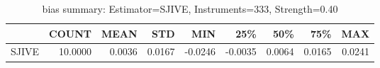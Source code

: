\begin{table}[ht]
\centering
\caption{bias summary: Estimator=SJIVE, Instruments=333, Strength=0.40}
\begin{tabular}{lrrrrrrrr}
\toprule
 & COUNT & MEAN & STD & MIN & 25\% & 50\% & 75\% & MAX \\
\midrule
SJIVE & 10.0000 & 0.0036 & 0.0167 & -0.0246 & -0.0035 & 0.0064 & 0.0165 & 0.0241 \\
\bottomrule
\end{tabular}
\end{table}
